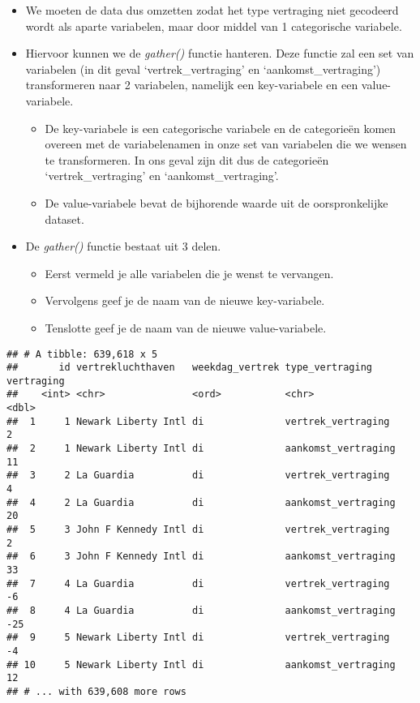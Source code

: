 \documentclass[]{memoir}
\providecommand{\tightlist}{%
  \setlength{\itemsep}{0pt}\setlength{\parskip}{0pt}}
\begin{document}
\begin{itemize}
\tightlist
\item
  We moeten de data dus omzetten zodat het type vertraging niet
  gecodeerd wordt als aparte variabelen, maar door middel van 1
  categorische variabele.
\item
  Hiervoor kunnen we de \emph{gather()} functie hanteren. Deze functie
  zal een set van variabelen (in dit geval `vertrek\_vertraging' en
  `aankomst\_vertraging') transformeren naar 2 variabelen, namelijk een
  key-variabele en een value-variabele.

  \begin{itemize}
  \tightlist
  \item
    De key-variabele is een categorische variabele en de categorieën
    komen overeen met de variabelenamen in onze set van variabelen die
    we wensen te transformeren. In ons geval zijn dit dus de categorieën
    `vertrek\_vertraging' en `aankomst\_vertraging'.
  \item
    De value-variabele bevat de bijhorende waarde uit de oorspronkelijke
    dataset.
  \end{itemize}
\item
  De \emph{gather()} functie bestaat uit 3 delen.

  \begin{itemize}
  \tightlist
  \item
    Eerst vermeld je alle variabelen die je wenst te vervangen.
  \item
    Vervolgens geef je de naam van de nieuwe key-variabele.
  \item
    Tenslotte geef je de naam van de nieuwe value-variabele.
  \end{itemize}
\end{itemize}

\begin{verbatim}
## # A tibble: 639,618 x 5
##       id vertrekluchthaven   weekdag_vertrek type_vertraging     vertraging
##    <int> <chr>               <ord>           <chr>                    <dbl>
##  1     1 Newark Liberty Intl di              vertrek_vertraging           2
##  2     1 Newark Liberty Intl di              aankomst_vertraging         11
##  3     2 La Guardia          di              vertrek_vertraging           4
##  4     2 La Guardia          di              aankomst_vertraging         20
##  5     3 John F Kennedy Intl di              vertrek_vertraging           2
##  6     3 John F Kennedy Intl di              aankomst_vertraging         33
##  7     4 La Guardia          di              vertrek_vertraging          -6
##  8     4 La Guardia          di              aankomst_vertraging        -25
##  9     5 Newark Liberty Intl di              vertrek_vertraging          -4
## 10     5 Newark Liberty Intl di              aankomst_vertraging         12
## # ... with 639,608 more rows
\end{verbatim}
\end{document}
